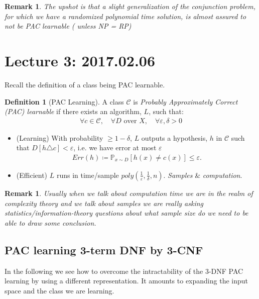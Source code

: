 \documentclass[12pt, letterpaper]{article}
\numberwithin{equation}{section} %
\newcommand{\mb}{\mathbb}
\newcommand{\mc}{\mathcal}
\newcommand{\ve}{\varepsilon}
\newtheorem{remark}[theorem]{Remark}
\theoremstyle{definition}
\newtheorem{definition}[theorem]{Definition}
\theoremstyle{remark}
\begin{document}
\begin{remark}
    The upshot is that a slight generalization of the conjunction problem, for which we have a randomized polynomial time solution, is almost assured to not be PAC learnable ( unless NP = RP)
\end{remark}




\section{Lecture 3: 2017.02.06}

Recall the definition of a class being PAC learnable.
\begin{definition}[PAC Learning]
	A class $\mc C$ is \emph{Probably Approximately Correct (PAC) learnable} if there exists an algorithm, $L$, such that:
	\begin{align}
    	\forall c \in \mc C,\quad \forall D \textrm{ over }X,\quad \forall \ve,\delta > 0
	\end{align} 
	\begin{itemize}
		\item (Learning) With probability $\geq 1 -\delta$, $L$ outputs a hypothesis, $h$ in $\mc 
		C$ such that $D[h\triangle c]<\ve$, i.e. we have error at most $\ve$
		\begin{align}
    		Err(h) \coloneqq \mb P_{x\sim D}[h(x) \ne c(x)] \leq \ve.
		\end{align}
		\item (Efficient) $L$ runs in time/sample $poly\left(\frac1\ve, \frac1\delta, n\right)$. \emph{Samples} \& \emph{computation}.
	\end{itemize}
\end{definition}
\begin{remark}
    Usually when we talk about computation time we are in the realm of complexity theory and we talk about samples we are really asking statistics/information-theory questions about what sample size do we need to be able to draw some conclusion.
\end{remark}

\subsection{PAC learning 3-term DNF by 3-CNF}
In the following we see how to overcome the intractability of the 3-DNF PAC learning by using a different representation. It amounts to expanding the input space and the class we are learning.
\end{document}
